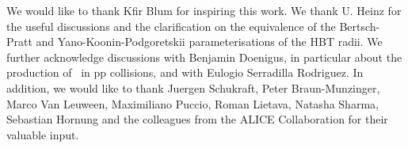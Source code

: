 \documentclass[%
 reprint,
 amsmath,amssymb,
 aps,
]{revtex4-1}
\begin{document}
\bigskip
 
\begin{acknowledgments}
We would like to thank Kfir Blum for inspiring this work. We thank U. Heinz for the useful discussions and the clarification on the equivalence of the Bertsch-Pratt and Yano-Koonin-Podgoretskii parameterisations of the HBT radii. We further acknowledge discussions with Benjamin Doenigus, in particular about the production of \hthreelambda\ in pp collisions, and with Eulogio Serradilla Rodriguez. In addition, we would like to thank Juergen Schukraft, Peter Braun-Munzinger, Marco Van Leuween, Maximiliano Puccio, Roman Lietava, Natasha Sharma, Sebastian Hornung and the colleagues from the ALICE Collaboration for their valuable input. 
\end{acknowledgments}


\end{document}
